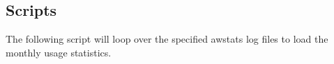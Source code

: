 
\setcounter{secnumdepth}{0}
\subsection{Scripts}

The following script will loop over the specified awstats log files
to load the monthly usage statistics.
\vspace{0.5in}

